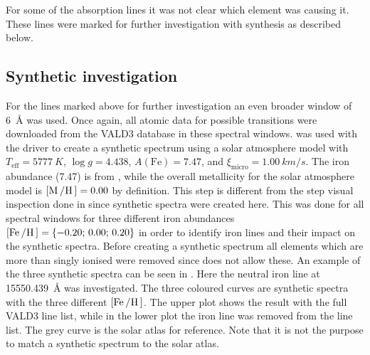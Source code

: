 For some of the absorption lines it was not clear which element was causing it. These lines were
marked for further investigation with synthesis as described below.

\subsection{Synthetic investigation}

For the lines marked above for further investigation an even broader window of \SI{6}{\angstrom} was
used. Once again, all atomic data for possible transitions were downloaded from the VALD3 database
in these spectral windows.  was used with the  driver to create a synthetic
spectrum using a solar atmosphere model with $T_\mathrm{eff}=\SI{5777}{K}$, $\log g=4.438$,
$A(\mathrm{Fe})=7.47$, and $\xi_\mathrm{micro}=\SI{1.00}{km/s}$. The iron abundance (7.47) is from
\citet{Gonzalez2000}, while the overall metallicity for the solar atmosphere model is
$[\ion{M}/\ion{H}]=0.00$ by definition. This step is different from the step visual inspection done
in  since synthetic spectra were created here. This was done for all spectral
windows for three different iron abundances $[\ion{Fe}/\ion{H}]=\{-0.20;\,0.00;\,0.20\}$ in order to
identify iron lines and their impact on the synthetic spectra. Before creating a synthetic spectrum
all elements which are more than singly ionised were removed since  does not allow these.
An example of the three synthetic spectra can be seen in . Here
the neutral iron line at \SI{15550.439}{\angstrom} was investigated. The three coloured curves are
synthetic spectra with the three different $[\ion{Fe}/\ion{H}]$. The upper plot shows the result
with the full VALD3 line list, while in the lower plot the iron line was removed from the line list.
The grey curve is the solar atlas for reference. Note that it is not the purpose to match a
synthetic spectrum to the solar atlas.

